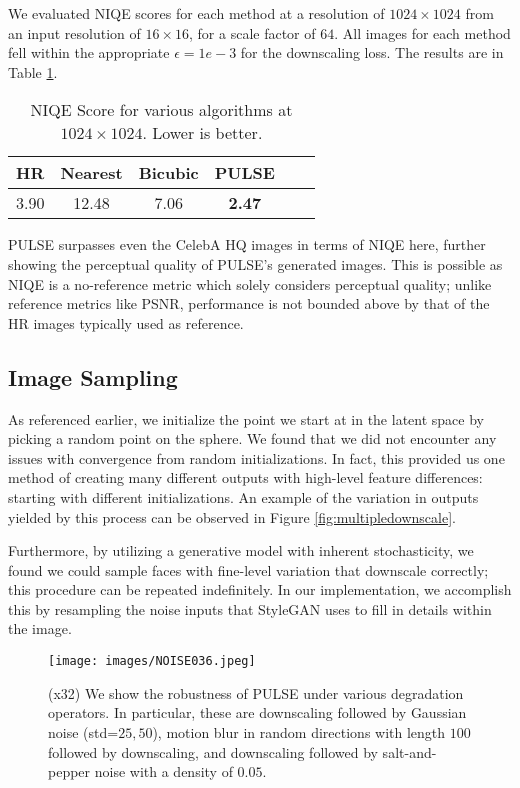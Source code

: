 \documentclass[10pt,twocolumn,letterpaper]{article}
\begin{document}
We evaluated NIQE scores for each method at a resolution of $1024 \times 1024$ from an input resolution of $16 \times 16$, for a scale factor of $64$. All images for each method fell within the appropriate $\epsilon = 1e-3$ for the downscaling loss. The results are in Table \ref{tab:NIQE}.
\begin{table}[]
\small{
\renewcommand{\arraystretch}{1.2}
\begin{tabular}{|c|c|c|c|c|c|}
\hline
HR   & Nearest & Bicubic & PULSE \\ \hline \hline
3.90 & 12.48 & 7.06 & \textbf{2.47}  \\ \hline
\end{tabular}
}
\centering
\caption{NIQE Score for various algorithms at $1024 \times 1024$. Lower is better.}
\label{tab:NIQE}
\end{table}
PULSE surpasses even the CelebA HQ images in terms of NIQE here, further showing the perceptual quality of PULSE's generated images. This is possible as NIQE is a no-reference metric which solely considers perceptual quality; unlike reference metrics like PSNR, performance is not bounded above by that of the HR images typically used as reference.







\subsection{Image Sampling}

As referenced earlier, we initialize the point we start at in the latent space by picking a random point on the sphere. We found that we did not encounter any issues with convergence from random initializations. In fact, this provided us one method of creating many different outputs with high-level feature differences: starting with different initializations. An example of the variation in outputs yielded by this process can be observed in Figure \ref{fig:multipledownscale}.

Furthermore, by utilizing a generative model with inherent stochasticity, we found we could sample faces with fine-level variation that downscale correctly; this procedure can be repeated indefinitely. In our implementation, we accomplish this by resampling the noise inputs that StyleGAN uses to fill in details within the image.




\begin{figure}[]
    \centering
    \texttt{[image: images/NOISE036.jpeg]}
    \caption{(x32) We show the robustness of PULSE under various degradation operators. In particular, these are downscaling followed by Gaussian noise (std=$25,50$), motion blur in random directions with length $100$ followed by downscaling, and downscaling followed by salt-and-pepper noise with a density of $0.05$.}
    \label{fig:NOISE}
\end{figure}
\end{document}

